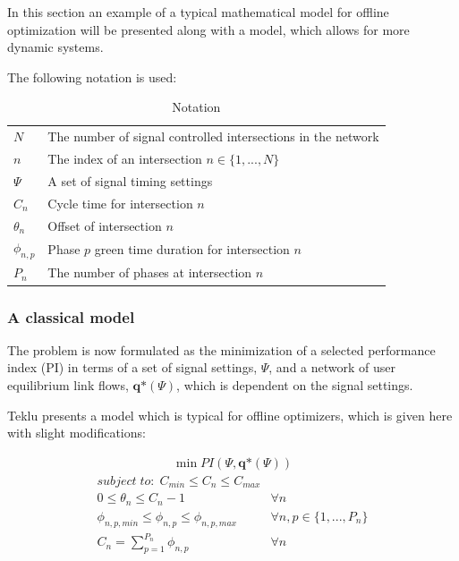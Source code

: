 \label{model}
In this section an example of a typical mathematical model for offline optimization will be presented along with a model, which allows for more dynamic systems.

The following notation is used:

\begin{table}[!ht]
\begin{center}
\begin{tabular}{ll}
\hline
$N$ & The number of signal controlled intersections in the network \\
$n$ & The index of an intersection $n \in \lbrace 1,...,N \rbrace$ \\
$\Psi$ & A set of signal timing settings \\
$C_n$ & Cycle time for intersection $n$ \\
$\theta_n$ & Offset of intersection $n$ \\
$\phi_{n,p}$ & Phase $p$ green time duration for intersection $n$  \\
$P_n$ & The number of phases at intersection $n$
\\ \hline
\end{tabular}
\end{center}
\caption{Notation}
\end{table}

\subsubsection*{A classical model}

The problem is now formulated as the minimization of a selected performance index (PI) in terms of a set of signal settings, $\Psi$, and a network of user equilibrium link flows, $\textbf{q*}(\Psi)$, which is dependent on the signal settings.

Teklu \cite{2} presents a model which is typical for offline optimizers, which is given here with slight modifications:

\begin{eqnarray}
\min PI \left(  \Psi, \textbf{q*}\left( \Psi\right)  \right)
\end{eqnarray}
\begin{eqnarray}
\label{eqn:cycletimeconstraints} subject\;to:\;C_{min} \leq C_n \leq C_{max} & \\
\label{eqn:offset} 0 \leq \theta_n \leq C_n-1 & \forall n \\
\label{eqn:greentimelimits} \phi_{n,p,min} \leq \phi_{n,p} \leq \phi_{n,p,max} & \forall n,p \in \lbrace 1,...,P_n \rbrace \\
\label{eqn:commoncycledef} C_n = \sum_{p=1}^{P_n} \phi_{n,p} & \forall n
\end{eqnarray}

